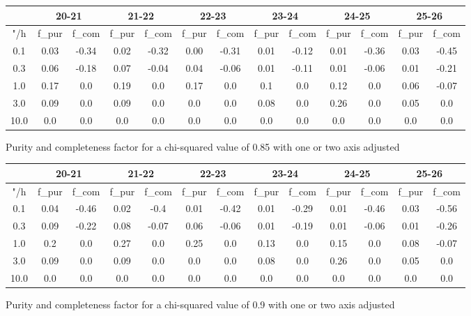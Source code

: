 \documentclass{article}
\begin{document}
\begin{figure}[H]
\centering
\begin{tabular}{|c|c|c|c|c|c|c|c|c|c|c|c|c|}
\hline
\multicolumn{1}{|c|}{} & \multicolumn{2}{|c|}{20-21} & \multicolumn{2}{|c|}{21-22} & \multicolumn{2}{|c|}{22-23} & \multicolumn{2}{|c|}{23-24} & \multicolumn{2}{|c|}{24-25} & \multicolumn{2}{|c|}{25-26}\\
\hline \hline
"/h & f\_pur & f\_com & f\_pur & f\_com & f\_pur & f\_com & f\_pur & f\_com & f\_pur & f\_com & f\_pur & f\_com \\
\hline
0.1 & 0.03 & -0.34 & 0.02 & -0.32 & 0.00 & -0.31 & 0.01 & -0.12 & 0.01 & -0.36 & 0.03 & -0.45\\
\hline
0.3 & 0.06 & -0.18 & 0.07 & -0.04 & 0.04 & -0.06 & 0.01 & -0.11 & 0.01 & -0.06 & 0.01 & -0.21\\
\hline
1.0 & 0.17 & 0.0 & 0.19 & 0.0 & 0.17 & 0.0 & 0.1 & 0.0 & 0.12 & 0.0 & 0.06 & -0.07\\
\hline
3.0 & 0.09 & 0.0 & 0.09 & 0.0 & 0.0 & 0.0 & 0.08 & 0.0 & 0.26 & 0.0 & 0.05 & 0.0\\
\hline
10.0 & 0.0 & 0.0 & 0.0 & 0.0 & 0.0 & 0.0 & 0.0 & 0.0 & 0.0 & 0.0 & 0.0 & 0.0\\
\hline
\end{tabular}
\caption{Purity and completeness factor for a chi-squared value of 0.85 with one or two axis adjusted}
\end{figure}

\begin{figure}[H]
\centering
\begin{tabular}{|c|c|c|c|c|c|c|c|c|c|c|c|c|}
\hline
\multicolumn{1}{|c|}{} & \multicolumn{2}{|c|}{20-21} & \multicolumn{2}{|c|}{21-22} & \multicolumn{2}{|c|}{22-23} & \multicolumn{2}{|c|}{23-24} & \multicolumn{2}{|c|}{24-25} & \multicolumn{2}{|c|}{25-26}\\
\hline \hline
"/h & f\_pur & f\_com & f\_pur & f\_com & f\_pur & f\_com & f\_pur & f\_com & f\_pur & f\_com & f\_pur & f\_com \\
\hline
0.1 & 0.04 & -0.46 & 0.02 & -0.4 & 0.01 & -0.42 & 0.01 & -0.29 & 0.01 & -0.46 & 0.03 & -0.56\\
\hline
0.3 & 0.09 & -0.22 & 0.08 & -0.07 & 0.06 & -0.06 & 0.01 & -0.19 & 0.01 & -0.06 & 0.01 & -0.26\\
\hline
1.0 & 0.2 & 0.0 & 0.27 & 0.0 & 0.25 & 0.0 & 0.13 & 0.0 & 0.15 & 0.0 & 0.08 & -0.07\\
\hline
3.0 & 0.09 & 0.0 & 0.09 & 0.0 & 0.0 & 0.0 & 0.08 & 0.0 & 0.26 & 0.0 & 0.05 & 0.0\\
\hline
10.0 & 0.0 & 0.0 & 0.0 & 0.0 & 0.0 & 0.0 & 0.0 & 0.0 & 0.0 & 0.0 & 0.0 & 0.0\\
\hline
\end{tabular}
\caption{Purity and completeness factor for a chi-squared value of 0.9 with one or two axis adjusted}
\end{figure}
\end{document}
